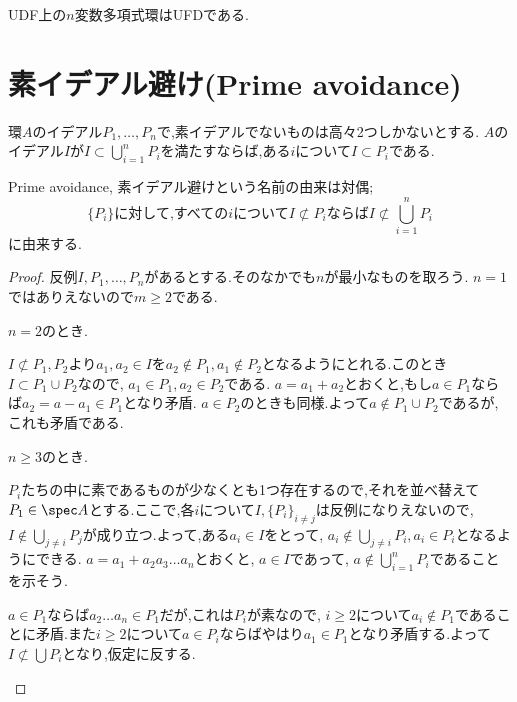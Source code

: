 \begin{cor}\label{cor:多変数もUFD}
	UDF上の$n$変数多項式環はUFDである.
\end{cor}


\section{素イデアル避け(Prime avoidance)}

\begin{lem}\label{lem:Prime avoidance}
	環$A$のイデアル$P_1,\dots, P_n$で,素イデアルでないものは高々2つしかないとする. $A$のイデアル$I$が$I\subset\bigcup_{i=1}^n P_i$を満たすならば,ある$i$について$I\subset P_i$である.
\end{lem}

Prime avoidance, 素イデアル避けという名前の由来は対偶;
\[\{P_i\}\text{に対して,すべての}i\text{について}I\not\subset P_i\text{ならば}I\not\subset\bigcup_{i=1}^n P_i\]
に由来する.
\begin{proof}
	反例$I,P_1,\dots, P_n$があるとする.そのなかでも$n$が最小なものを取ろう. $n=1$ではありえないので$m\geq 2$である.
	
	\begin{sakura}
		\item $n=2$のとき.
		
		$I\not\subset P_1,P_2$より$a_1,a_2\in I$を$a_2\not\in P_1,a_1\not\in P_2$となるようにとれる.このとき$I\subset P_1\cup P_2$なので, $a_1\in P_1,a_2\in P_2$である. $a=a_1+a_2$とおくと,もし$a\in P_1$ならば$a_2=a-a_1\in P_1$となり矛盾. $a\in P_2$のときも同様.よって$a\not\in P_1\cup P_2$であるが,これも矛盾である.
		
		\item $n\geq3$のとき.
		
		$P_i$たちの中に素であるものが少なくとも1つ存在するので,それを並べ替えて$P_1\in\spec A$とする.ここで,各$i$について$I,\{P_i\}_{i\neq j}$は反例になりえないので, $I\not\in\bigcup_{j\neq i}P_j$が成り立つ.よって,ある$a_i\in I$をとって, $a_i\not\in\bigcup_{j\neq i}P_i,a_i\in P_i$となるようにできる. $a=a_1+a_2a_3\dots a_n$とおくと, $a\in I$であって, $a\not\in\bigcup_{i=1}^n P_i$であることを示そう.
		
		$a\in P_1$ならば$a_2\dots a_n\in P_1$だが,これは$P_i$が素なので, $i\geq2$について$a_i\not\in P_1$であることに矛盾.また$i\geq2$について$a\in P_i$ならばやはり$a_1\in P_1$となり矛盾する.よって$I\not\subset\bigcup P_i$となり,仮定に反する.
	\end{sakura}
\end{proof}

